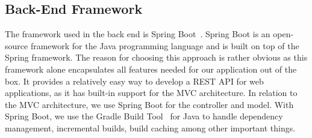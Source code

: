 \subsection{Back-End Framework}\label{subsec:back-end-framework}

The framework used in the back end is Spring Boot~\cite{springboot2024}.
Spring Boot is an open-source framework for the Java programming language and is built on top of the Spring framework.
The reason for choosing this approach is rather obvious as this framework alone encapsulates all features needed for our
application out of the box.
It provides a relatively easy way to develop a REST API for web applications, as it has built-in support for the MVC
architecture.
In relation to the MVC architecture, we use Spring Boot for the controller and model.
With Spring Boot, we use the Gradle Build Tool~\cite{gradle2024} for Java to handle dependency management, incremental
builds, build caching among other important things.
